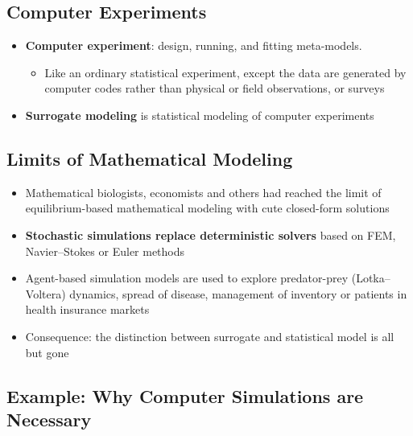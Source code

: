 \documentclass[
  letterpaper,
  DIV=11,
  numbers=noendperiod]{scrreprt}
\providecommand{\tightlist}{%
  \setlength{\itemsep}{0pt}\setlength{\parskip}{0pt}}\usepackage{longtable,booktabs,array}
\begin{document}
\hypertarget{computer-experiments}{%
\subsection{Computer Experiments}\label{computer-experiments}}

\begin{itemize}
\tightlist
\item
  \textbf{Computer experiment}: design, running, and fitting
  meta-models.

  \begin{itemize}
  \tightlist
  \item
    Like an ordinary statistical experiment, except the data are
    generated by computer codes rather than physical or field
    observations, or surveys
  \end{itemize}
\item
  \textbf{Surrogate modeling} is statistical modeling of computer
  experiments
\end{itemize}

\hypertarget{limits-of-mathematical-modeling}{%
\subsection{Limits of Mathematical
Modeling}\label{limits-of-mathematical-modeling}}

\begin{itemize}
\tightlist
\item
  Mathematical biologists, economists and others had reached the limit
  of equilibrium-based mathematical modeling with cute closed-form
  solutions
\item
  \textbf{Stochastic simulations replace deterministic solvers} based on
  FEM, Navier--Stokes or Euler methods
\item
  Agent-based simulation models are used to explore predator-prey
  (Lotka--Voltera) dynamics, spread of disease, management of inventory
  or patients in health insurance markets
\item
  Consequence: the distinction between surrogate and statistical model
  is all but gone
\end{itemize}

\hypertarget{example-why-computer-simulations-are-necessary}{%
\subsection{Example: Why Computer Simulations are
Necessary}\label{example-why-computer-simulations-are-necessary}}
\end{document}
